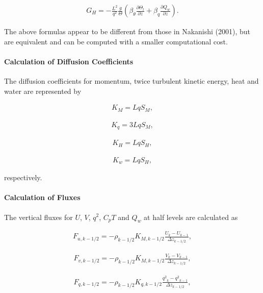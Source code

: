 \begin{eqnarray}G_H=-\frac{L^2}{q^2}\frac{g}{\Theta}\left(\beta_\theta \frac{\partial \Theta_l}{\partial z}+\beta_q \frac{\partial Q_w}{\partial z}\right).\end{eqnarray}

The above formulas appear to be different from those in Nakanishi (2001), but are equivalent and can be computed with a smaller computational cost.

\hypertarget{calculation-of-diffusion-coefficients-1}{%
\paragraph{Calculation of Diffusion Coefficients}\label{calculation-of-diffusion-coefficients-1}}

The diffusion coefficients for momentum, twice turbulent kinetic energy, heat and water are represented by

\begin{eqnarray}K_M=LqS_M,\end{eqnarray}

\begin{eqnarray}K_q=3LqS_M,\end{eqnarray}

\begin{eqnarray}K_H=LqS_H,\end{eqnarray}

\begin{eqnarray}K_w=LqS_H,\end{eqnarray}

respectively.

\hypertarget{calculation-of-fluxes}{%
\paragraph{Calculation of Fluxes}\label{calculation-of-fluxes}}

The vertical fluxes for \(U\), \(V\), \(q^2\), \(C_pT\) and \(Q_w\) at half levels are calculated as

\begin{eqnarray}F_{u,k-1/2}=-\rho_{k-1/2}K_{M,k-1/2}\frac{U_{k}-U_{k-1}}{\Delta z_{k-1/2}},\end{eqnarray}

\begin{eqnarray}F_{v,k-1/2}=-\rho_{k-1/2}K_{M,k-1/2}\frac{V_{k}-V_{k-1}}{\Delta z_{k-1/2}},\end{eqnarray}

\begin{eqnarray}F_{q,k-1/2}=-\rho_{k-1/2}K_{q,k-1/2}\frac{{q^2}_ {k}-{q^2}_ {k-1}}{\Delta z_{k-1/2}},\end{eqnarray}

